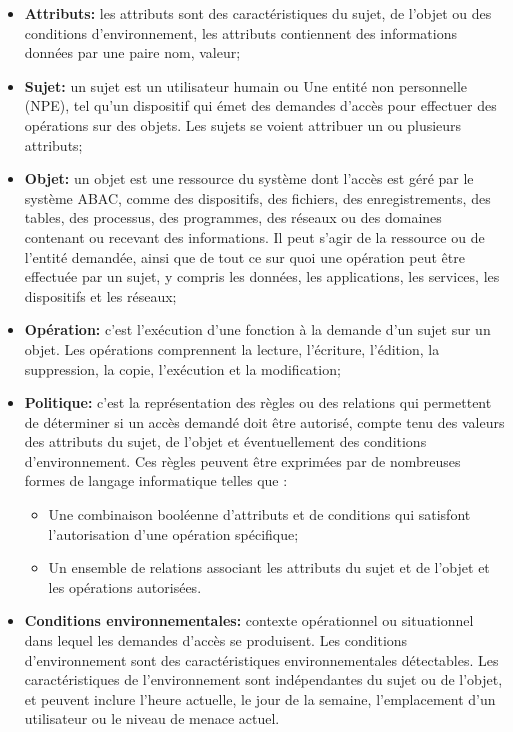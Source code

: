 \begin{itemize}
\item \textbf{Attributs:} les attributs sont des caractéristiques du sujet, de l'objet ou des conditions d'environnement, les attributs contiennent des informations données par une paire nom, valeur;
\item \textbf{Sujet:} un sujet est un utilisateur humain ou Une entité non personnelle (NPE), tel qu'un dispositif qui émet des demandes d'accès pour effectuer des opérations sur des objets. Les sujets se voient attribuer un ou plusieurs attributs;
\item \textbf{Objet:} un objet est une ressource du système dont l'accès est géré par le système ABAC, comme des dispositifs, des fichiers, des enregistrements, des tables, des processus, des programmes, des réseaux ou des domaines contenant ou recevant des informations. Il peut s'agir de la ressource ou de l'entité demandée, ainsi que de tout ce sur quoi une opération peut être effectuée par un sujet, y compris les données, les applications, les services, les dispositifs et les réseaux;
\item \textbf{Opération:} c'est l'exécution d'une fonction à la demande d'un sujet sur un objet. Les opérations comprennent la lecture, l'écriture, l'édition, la suppression, la copie, l'exécution et la modification;
\item \textbf{Politique:} c'est la représentation des règles ou des relations qui permettent de déterminer si un accès demandé doit être autorisé, compte tenu des valeurs des attributs du sujet, de l'objet et éventuellement des conditions d'environnement. Ces règles peuvent être exprimées par de nombreuses formes de langage informatique telles que : 
\begin{itemize}
\item Une combinaison booléenne d'attributs et de conditions qui satisfont l'autorisation d'une opération spécifique;
\item Un ensemble de relations associant les attributs du sujet et de l'objet et les opérations autorisées.
\end{itemize}
\item \textbf{Conditions environnementales:} contexte opérationnel ou situationnel dans lequel les demandes d'accès se produisent. Les conditions d'environnement sont des caractéristiques environnementales détectables. Les caractéristiques de l'environnement sont indépendantes du sujet ou de l'objet, et peuvent inclure l'heure actuelle, le jour de la semaine, l'emplacement d'un utilisateur ou le niveau de menace actuel.
\end{itemize}

